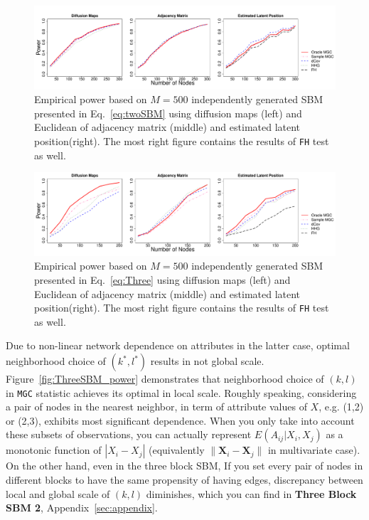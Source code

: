 \documentclass[12pt]{article}
\theoremstyle{definition}
\begin{document}
\begin{figure}[h]
	\centering
	\includegraphics[width=6in]{../Figure/twoSBM.pdf}
	\caption{Empirical power based on $M = 500$ independently generated SBM presented in Eq.~\ref{eq:twoSBM} using diffusion maps (left) and Euclidean of adjacency matrix (middle)  and estimated latent position(right). The most right figure contains the results of \texttt{FH} test as well.}
		\label{fig:twoSBM}
\end{figure}
\begin{figure}[h]
	\centering
	\includegraphics[width=6in]{../Figure/ThreeSBM.pdf}
	\caption{Empirical power based on $M = 500$ independently generated SBM presented in Eq.~\ref{eq:Three} using diffusion maps (left) and Euclidean of adjacency matrix (middle)  and estimated latent position(right). The most right figure contains the results of \texttt{FH} test as well.}
	\label{fig:Three}
\end{figure}	

Due to non-linear network dependence on attributes in the latter case, optimal neighborhood choice of $(k^{*}, l^{*})$ results in not global scale.  Figure~\ref{fig:ThreeSBM_power} demonstrates that neighborhood choice of $(k,l)$ in \texttt{MGC} statistic achieves its optimal in local scale. Roughly speaking, considering a pair of nodes in the nearest neighbor, in term of attribute values of $X$, e.g. (1,2) or (2,3), exhibits most significant dependence. When you only take into account these subsets of observations, you can actually represent $E(A_{ij} | X_{i}, X_{j})$ as a monotonic function of $|X_{i} - X_{j}|$ (equivalently $\parallel \mathbf{X}_{i} - \mathbf{X}_{j} \parallel$ in multivariate case). On the other hand, even in the three block SBM, If you set every pair of nodes in different blocks to have the same propensity of having edges, discrepancy between local and global scale of $(k,l)$ diminishes, which you can find in \textbf{Three Block SBM 2}, Appendix~\ref{sec:appendix}.
\end{document}
